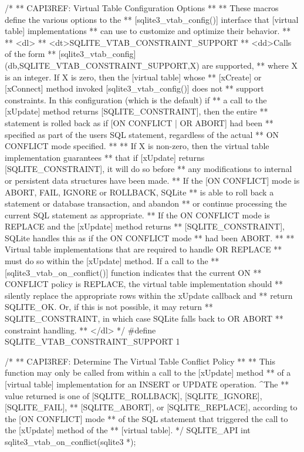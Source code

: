 \begin{Codex}[label=sqlite3.h,numbers=left]
{/*
** CAPI3REF: Virtual Table Configuration Options
**
** These macros define the various options to the
** [sqlite3_vtab_config()] interface that [virtual table] implementations
** can use to customize and optimize their behavior.
**
** <dl>
** <dt>SQLITE_VTAB_CONSTRAINT_SUPPORT
** <dd>Calls of the form
** [sqlite3_vtab_config](db,SQLITE_VTAB_CONSTRAINT_SUPPORT,X) are supported,
** where X is an integer.  If X is zero, then the [virtual table] whose
** [xCreate] or [xConnect] method invoked [sqlite3_vtab_config()] does not
** support constraints.  In this configuration (which is the default) if
** a call to the [xUpdate] method returns [SQLITE_CONSTRAINT], then the entire
** statement is rolled back as if [ON CONFLICT | OR ABORT] had been
** specified as part of the users SQL statement, regardless of the actual
** ON CONFLICT mode specified.
**
** If X is non-zero, then the virtual table implementation guarantees
** that if [xUpdate] returns [SQLITE_CONSTRAINT], it will do so before
** any modifications to internal or persistent data structures have been made.
** If the [ON CONFLICT] mode is ABORT, FAIL, IGNORE or ROLLBACK, SQLite 
** is able to roll back a statement or database transaction, and abandon
** or continue processing the current SQL statement as appropriate. 
** If the ON CONFLICT mode is REPLACE and the [xUpdate] method returns
** [SQLITE_CONSTRAINT], SQLite handles this as if the ON CONFLICT mode
** had been ABORT.
**
** Virtual table implementations that are required to handle OR REPLACE
** must do so within the [xUpdate] method. If a call to the 
** [sqlite3_vtab_on_conflict()] function indicates that the current ON 
** CONFLICT policy is REPLACE, the virtual table implementation should 
** silently replace the appropriate rows within the xUpdate callback and
** return SQLITE_OK. Or, if this is not possible, it may return
** SQLITE_CONSTRAINT, in which case SQLite falls back to OR ABORT 
** constraint handling.
** </dl>
*/
#define SQLITE_VTAB_CONSTRAINT_SUPPORT 1

/*
** CAPI3REF: Determine The Virtual Table Conflict Policy
**
** This function may only be called from within a call to the [xUpdate] method
** of a [virtual table] implementation for an INSERT or UPDATE operation. ^The
** value returned is one of [SQLITE_ROLLBACK], [SQLITE_IGNORE], [SQLITE_FAIL],
** [SQLITE_ABORT], or [SQLITE_REPLACE], according to the [ON CONFLICT] mode
** of the SQL statement that triggered the call to the [xUpdate] method of the
** [virtual table].
*/
SQLITE_API int sqlite3_vtab_on_conflict(sqlite3 *);

}
\end{Codex}
